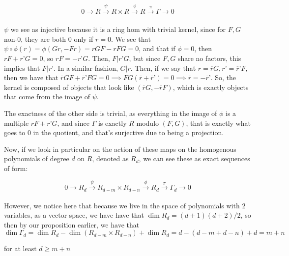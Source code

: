 \documentclass[10pt]{article}
\begin{document}
$$ 0 \xrightarrow[]{} R \xrightarrow[]{\psi} R \times R \xrightarrow[]{\phi} R \xrightarrow[]{\pi} \Gamma \to 0 $$

$\psi$ we see as injective because it is a ring hom with trivial kernel, since for $F, G$ non-0, they are both 0 only if $r =0$. We see that $\psi \circ \phi(r) = \phi(Gr, -Fr) = rGF - rFG = 0$, and that if $\phi = 0$, then $rF + r’G = 0$, so $rF = -r’G$. Then, $F | r’G$, but since $F,G$ share no factors, this implies that $F| r’$. In a similar fashion, $G | r$. Then, if we say that $r = \overline{r}G, r’ = \overline{r}’F$, then we have that $\overline{r}GF + \overline{r}’FG = 0 \implies FG(\overline{r} + \overline{r}’) =0 \implies \overline{r} = - \overline{r}’$. So, the kernel is composed of objects that look like $(\overline{r}G, -\overline{r}F)$, which is exactly objects that come from the image of $\psi$. 

The exactness of the other side is trivial, as everything in the image of $\phi$ is a multiple $rF + r’G$, and since $\Gamma$ is exactly $R$ modulo $(F,G)$, that is exactly what goes to 0 in the quotient, and that’s surjective due to being a projection.

Now, if we look in particular on the action of these maps on the homogenous polynomials of degree $d$ on $R$, denoted as $R_d$, we can see these as exact sequences of form:

$$ 0 \xrightarrow[]{} R_d \xrightarrow[]{\psi} R_{d-m} \times R_{d-n} \xrightarrow[]{\phi} R_d \xrightarrow[]{\pi} \Gamma_d \to 0 $$

However, we notice here that because we live in the space of polynomials with 2 variables, as a vector space, we have have that $\dim R_d = (d+1)(d+2)/2$, so then by our proposition earlier, we have that 
$$\dim \Gamma_d = \dim R_d - \dim(R_{d-m} \times R_{d-n}) + \dim R_d = d - (d-m + d-n) + d = m +n$$

for at least $d \geq m + n$
\end{document}
